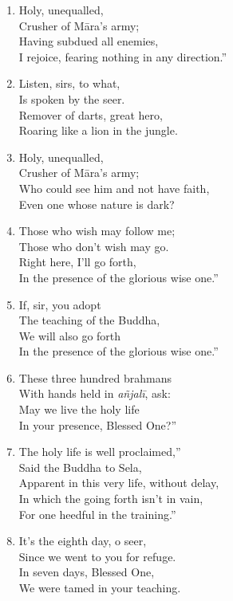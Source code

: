 \documentclass[10pt, openany]{book}
\newcommand*{\vleftofline}[1]{\leavevmode\llap{#1}}
\begin{document}
\begin{enumerate}
\item Holy, unequalled,\\
Crusher of Māra’s army;\\
Having subdued all enemies,\\
I rejoice, fearing nothing in any direction.”

\item \vleftofline{“}Listen, sirs, to what,\\
Is spoken by the seer.\\
Remover of darts, great hero,\\
Roaring like a lion in the jungle.

\item Holy, unequalled,\\
Crusher of Māra’s army;\\
Who could see him and not have faith,\\
Even one whose nature is dark?

\item Those who wish may follow me;\\
Those who don’t wish may go.\\
Right here, I’ll go forth,\\
In the presence of the glorious wise one.”

\item \vleftofline{“}If, sir, you adopt\\
The teaching of the Buddha,\\
We will also go forth\\
In the presence of the glorious wise one.”

\item These three hundred brahmans\\
With hands held in \emph{añjalī}, ask:\\
\vleftofline{“}May we live the holy life\\
In your presence, Blessed One?”

\item \vleftofline{“}The holy life is well proclaimed,”\\
Said the Buddha to Sela,\\
\vleftofline{“}Apparent in this very life, without delay,\\
In which the going forth isn’t in vain,\\
For one heedful in the training.”

\item \vleftofline{“}It’s the eighth day, o seer,\\
Since we went to you for refuge.\\
In seven days, Blessed One,\\
We were tamed in your teaching.


\end{enumerate}
\end{document}
